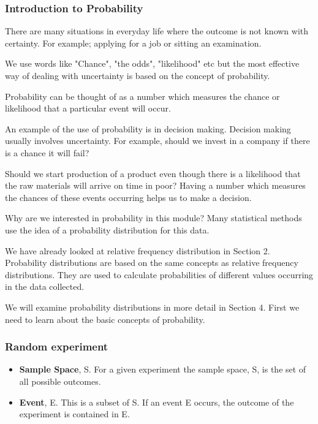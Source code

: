 \documentclass[IntroMain.tex]{subfiles}
\begin{document}

\begin{frame}
	\frametitle{Introduction to Probability}
	
	There are many situations in everyday life where the outcome is not known with certainty. For example; applying for a job or sitting an examination.
	
	We use words like "Chance", "the odds", "likelihood" etc but the most effective way of dealing with uncertainty is based on the concept of probability.
	
	Probability can be thought of as a number which measures the chance or likelihood that a particular event will occur.
	
	
\end{frame}
\begin{frame}
	An example of the use of probability is in decision making. Decision making usually involves uncertainty. For example, should we invest in a company if there is a chance it will fail? 
	
	Should we start production of a product even though there is a likelihood that the raw materials will arrive on time in poor? Having a number which measures the chances of these events occurring helps us to make a decision.
	
	
	
	Why are we interested in probability in this module? Many statistical methods use the idea of a probability distribution for this data.
	
	
\end{frame}
\begin{frame}
	
	We have already looked at relative frequency distribution in Section 2. Probability distributions are based on the same concepts as relative frequency distributions. They are used to calculate probabilities of different values occurring in the data collected.
	
	We will examine probability distributions in more detail in Section 4. First we need to learn about the basic concepts of probability.
	
	
	
\end{frame}
\begin{frame}
	\frametitle{Random experiment}
	\begin{itemize}
		\item \textbf{Sample Space}, S. For a given experiment the sample space, S, is the set of all
		possible outcomes.
		\item \textbf{Event}, E. This is a subset of S. If an event E occurs, the outcome of the experiment is contained in E.
	\end{itemize}
	
\end{frame}
\end{document}
